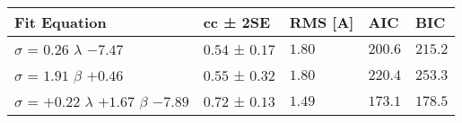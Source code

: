 \begin{tabular}{lllll}
\toprule
Fit Equation & cc ± 2SE & RMS [A] & AIC & BIC \\
\midrule
$\sigma$ = $0.26$ $\lambda$ $-7.47$ & $0.54$ ± $0.17$ & $1.80$ & $200.6$ & $215.2$ \\
$\sigma$ = $1.91$ $\beta$ $+0.46$ & $0.55$ ± $0.32$ & $1.80$ & $220.4$ & $253.3$ \\
$\sigma$ = $+0.22$ $\lambda$ $+1.67$ $\beta$ $-7.89$ & $0.72$ ± $0.13$ & $1.49$ & $173.1$ & $178.5$ \\
\bottomrule
\end{tabular}
